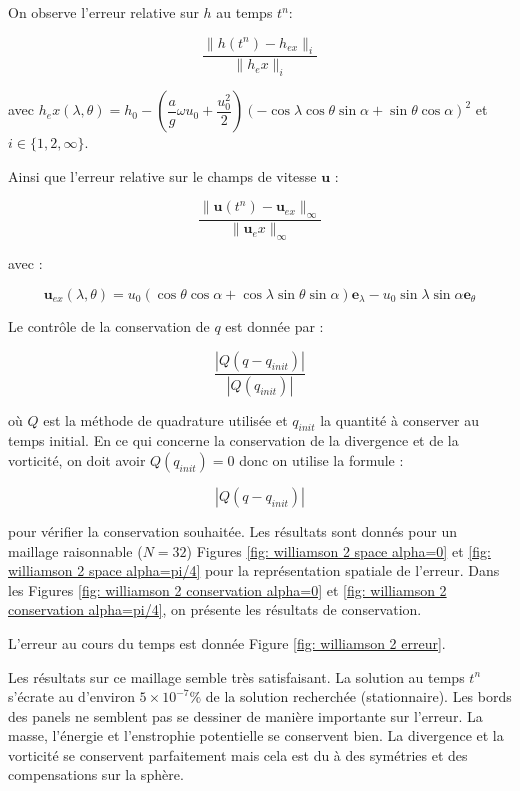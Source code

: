 On observe l'erreur relative sur $h$ au temps $t^n$:

\begin{equation}
\dfrac{\| h(t^n) - h_{ex}\|_i}{\| h_ex \|_i}
\end{equation}

avec $h_ex(\lambda, \theta) = h_0 - \left( \dfrac{a}{g} \omega u_0 + \dfrac{u_0^2}{2} \right) \left( - \cos \lambda \cos \theta \sin \alpha + \sin \theta \cos \alpha \right)^2$ et $i \in \lbrace 1,2,\infty \rbrace$.

Ainsi que l'erreur relative sur le champs de vitesse $\mathbf{u}$ : 

\begin{equation}
\dfrac{\| \mathbf{u}(t^n) - \mathbf{u}_{ex}\|_{\infty}}{\| \mathbf{u}_ex \|_\infty}
\end{equation}

avec :

\begin{equation}
\mathbf{u}_{ex}(\lambda, \theta) = u_0 \left( \cos \theta \cos \alpha + \cos \lambda \sin \theta \sin \alpha \right) \mathbf{e}_{\lambda} - u_0 \sin \lambda \sin \alpha \mathbf{e}_{\theta}
\end{equation}

Le contrôle de la conservation de $q$ est donnée par :

\begin{equation}
\dfrac{|Q(q - q_{init})|}{|Q(q_{init})|}
\end{equation}

où $Q$ est la méthode de quadrature utilisée et $q_{init}$ la quantité à conserver au temps initial. En ce qui concerne la conservation de la divergence et de la vorticité, on doit avoir $Q(q_{init})=0$ donc on utilise la formule :

\begin{equation}
|Q(q - q_{init})|
\end{equation}

pour vérifier la conservation souhaitée. Les résultats sont donnés pour un maillage raisonnable ($N=32$)  Figures \ref{fig: williamson 2 space alpha=0} et \ref{fig: williamson 2 space alpha=pi/4} pour la représentation spatiale de l'erreur. Dans les Figures \ref{fig: williamson 2 conservation alpha=0} et \ref{fig: williamson 2 conservation alpha=pi/4}, on présente les résultats de conservation.

L'erreur au cours du temps est donnée Figure \ref{fig: williamson 2 erreur}.

Les résultats sur ce maillage semble très satisfaisant. La solution au temps $t^n$ s'écrate au d'environ $5 \times 10^{-7} \%$ de la solution recherchée (stationnaire).
Les bords des panels ne semblent pas se dessiner de manière importante sur l'erreur. 
La masse, l'énergie et l'enstrophie potentielle se conservent bien. La divergence et la vorticité se conservent parfaitement mais cela est du à des symétries et des compensations sur la sphère.

